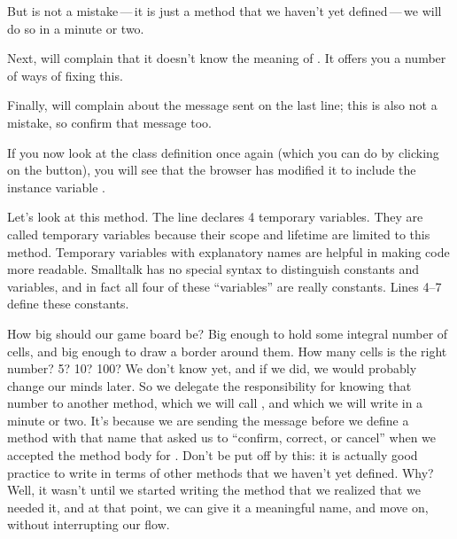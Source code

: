 \documentclass[a4paper,10pt,twoside]{book}
\begin{document}
{But  is not a mistake\,---\,it is just a method that we haven't yet defined\,---\,we will do so in a minute or two.


Next, \pharo will complain that it doesn't know the meaning of .  It offers you a number of ways of fixing this.

Finally, \pharo will complain about the message  sent on the last line; this is also not a mistake, so confirm that message too.

If you now look at the class definition once again (which you can do by clicking on the  button), you will see that the browser has modified it to include the instance variable .

Let's look at this  method.
The line   declares 4 temporary variables. They are called temporary variables because their scope and lifetime are limited to this method.  Temporary variables with explanatory names are helpful in making code more readable.  Smalltalk has no special syntax to distinguish constants and variables, and in fact all four of these ``variables'' are really constants. 
Lines 4--7 define these constants.

How big should our game board be?  Big enough to hold some integral number of cells, and big enough to draw a border around them.
How many cells is the right number?  5? 10? 100? We don't know yet, and if we did, we would probably change our minds later.  So we delegate the responsibility for knowing that number to another method, which we will call , and which we will write in a minute or two.
It's because we are sending the  message before we define a method with that name that \pharo asked us to ``confirm, correct, or cancel'' when we accepted the method body for .
Don't be put off by this: it is actually good practice to write in terms of other methods that we haven't yet defined.
Why?  Well, it wasn't until we started writing the  method that we realized that we needed it, and at that point, we can give it a meaningful name, and move on, without interrupting our flow.
 
}
\end{document}

